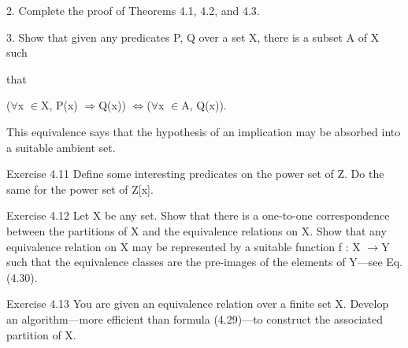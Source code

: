 \documentclass[11pt]{article}
\theoremstyle{plain}
\theoremstyle{definition}
\begin{document}
2. Complete the proof of Theorems 4.1, 4.2, and 4.3.

3. Show that given any predicates P, Q over a set X, there is a subset A of X such

that

($\forall$x $\in$X, P(x) $\Rightarrow$Q(x)) $\Leftrightarrow$($\forall$x $\in$A, Q(x)).

This equivalence says that the hypothesis of an implication may be absorbed into a suitable ambient set.

Exercise 4.11 Define some interesting predicates on the power set of Z. Do the same for the power set of Z[x].

Exercise 4.12 Let X be any set. Show that there is a one-to-one correspondence between the partitions of X and the equivalence relations on X. Show that any equivalence relation on X may be represented by a suitable function f : X $\to$Y such that the equivalence classes are the pre-images of the elements of Y---see Eq. (4.30).

Exercise 4.13 You are given an equivalence relation over a finite set X. Develop an algorithm---more efficient than formula (4.29)---to construct the associated partition of X.
\end{document}
